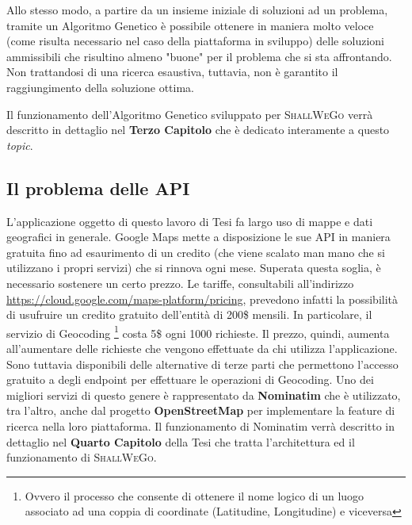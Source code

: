             Allo stesso modo, a partire da un insieme iniziale di soluzioni ad un problema, tramite un Algoritmo Genetico è possibile ottenere in maniera molto veloce (come risulta necessario nel caso della piattaforma in sviluppo) delle soluzioni ammissibili che risultino almeno "buone" per il problema che si sta affrontando. Non trattandosi di una ricerca esaustiva, tuttavia, non è garantito il raggiungimento della soluzione ottima.

            Il funzionamento dell'Algoritmo Genetico sviluppato per \textsc{ShallWeGo} verrà descritto in dettaglio nel \textbf{Terzo Capitolo} che è dedicato interamente a questo \textit{topic}.

        \subsection{Il problema delle API}
            L'applicazione oggetto di questo lavoro di Tesi fa largo uso di mappe e dati geografici in generale. Google Maps mette a disposizione le sue API in maniera gratuita fino ad esaurimento di un credito (che viene scalato man mano che si utilizzano i propri servizi) che si rinnova ogni mese. Superata questa soglia, è necessario sostenere un certo prezzo.
            Le tariffe, consultabili all'indirizzo \url{https://cloud.google.com/maps-platform/pricing}, prevedono infatti la possibilità di usufruire un credito gratuito dell'entità di 200\$ mensili. In particolare, il servizio di Geocoding \footnote[1]{Ovvero il processo che consente di ottenere il nome logico di un luogo associato ad una coppia di coordinate (Latitudine, Longitudine) e viceversa} costa 5\$ ogni 1000 richieste. Il prezzo, quindi, aumenta all'aumentare delle richieste che vengono effettuate da chi utilizza l'applicazione.
            Sono tuttavia disponibili delle alternative di terze parti che permettono l'accesso gratuito a degli endpoint per effettuare le operazioni di Geocoding. Uno dei migliori servizi di questo genere è rappresentato da \textbf{Nominatim} che è utilizzato, tra l'altro, anche dal progetto \textbf{OpenStreetMap} per implementare la feature di ricerca nella loro piattaforma. Il funzionamento di Nominatim verrà descritto in dettaglio nel \textbf{Quarto Capitolo} della Tesi che tratta l'architettura ed il funzionamento di \textsc{ShallWeGo}.
    
